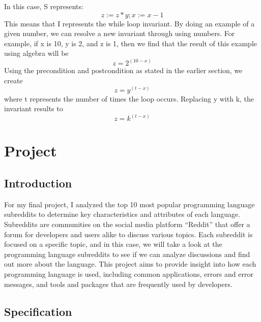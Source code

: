 \documentclass{article}
\theoremstyle{theorem}
\theoremstyle{definition}
\theoremstyle{remark}
\begin{document}
In this case, S represents: $$z := z * y; x:= x - 1$$ This means that I represents the while loop invariant. By doing an example of a given number, we can resolve a new invariant through using numbers. For example, if x is 10, y is 2, and z is 1, then we find that the result of this example using algebra will be $$z = 2^{(10-x)}$$ Using the precondition and postcondition as stated in the earlier section, we create $$z = y^{(t - x)}$$ where t represents the number of times the loop occurs. Replacing y with k, the invariant results to $$z = k^{(t - x)}$$

\section{Project}

\subsection{Introduction}

For my final project, I analyzed the top 10 most popular programming language subreddits to determine key characteristics and attributes of each language. Subreddits are communities on the social media platform “Reddit” that offer a forum for developers and users alike to discuss various topics. Each subreddit is focused on a specific topic, and in this case, we will take a look at the programming language subreddits to see if we can analyze discussions and find out more about the language. This project aims to provide insight into how each programming language is used, including common applications, errors and error messages, and tools and packages that are frequently used by developers.

\subsection{Specification}
\end{document}
